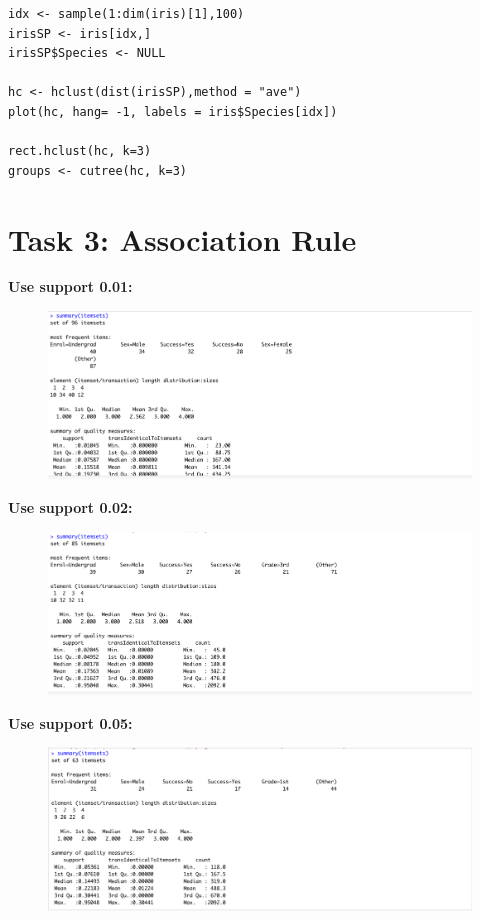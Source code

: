 \documentclass{article}
\begin{document}
\begin{lstlisting}
idx <- sample(1:dim(iris)[1],100)
irisSP <- iris[idx,]
irisSP$Species <- NULL

hc <- hclust(dist(irisSP),method = "ave")
plot(hc, hang= -1, labels = iris$Species[idx])

rect.hclust(hc, k=3)
groups <- cutree(hc, k=3)

\end{lstlisting}


\section{Task 3: Association Rule}

\textbf{Use support 0.01:}
\begin{figure}[H]
    \includegraphics[width=1\textwidth]{Fig8}
\end{figure}

\textbf{Use support 0.02:}
\begin{figure}[H]
    \includegraphics[width=1\textwidth]{Fig9}
\end{figure}


\textbf{Use support 0.05:}
\begin{figure}[H]
    \includegraphics[width=1\textwidth]{Fig10}
\end{figure}
\end{document}
